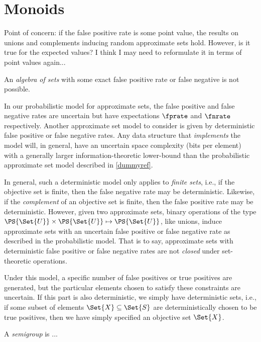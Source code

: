 \documentclass[ ../main.tex]{subfiles}
\begin{document}
\chapter{Monoids}
\label{sec:monoids}

Point of concern: if the false positive rate is some point value, the results on unions and complements inducing random approximate sets hold. However, is it true for the expected values? I think I may need to reformulate it in terms of point values again... 


An \emph{algebra of sets} with some exact false positive rate or false negative is not possible.



In our probabilistic model for approximate sets, the false positive and false negative rates are uncertain but have expectations $\fprate$ and $\fnrate$ respectively. Another approximate set model to consider is given by deterministic false positive or false negative rates. Any data structure that \emph{implements} the model will, in general, have an uncertain space complexity (bits per element) with a generally larger information-theoretic lower-bound than the  probabilistic approximate set model described in \cref{dummyref}.

In general, such a deterministic model only applies to \emph{finite sets}, i.e., if the objective set is finite, then the false negative rate may be deterministic. Likewise, if the \emph{complement} of an objective set is finite, then the false positive rate may be deterministic. However, given two approximate sets, binary operations of the type $\PS{\Set{U}} \times \PS{\Set{U}} \mapsto \PS{\Set{U}}$, like unions, induce approximate sets with an uncertain false positive or false negative rate as described in the probabilistic model. That is to say, approximate sets with deterministic false positive or false negative rates are not \emph{closed} under set-theoretic operations.

Under this model, a specific number of false positives or true positives are generated, but the particular elements chosen to satisfy these constraints are uncertain. If this part is also deterministic, we simply have deterministic sets, i.e., if some subset of elements $\Set{X} \subseteq \Set{S}$ are deterministically chosen to be true positives, then we have simply specified an objective set $\Set{X}$.

\begin{definition}
A \emph{semigroup} is ...
\end{definition}
\end{document}
